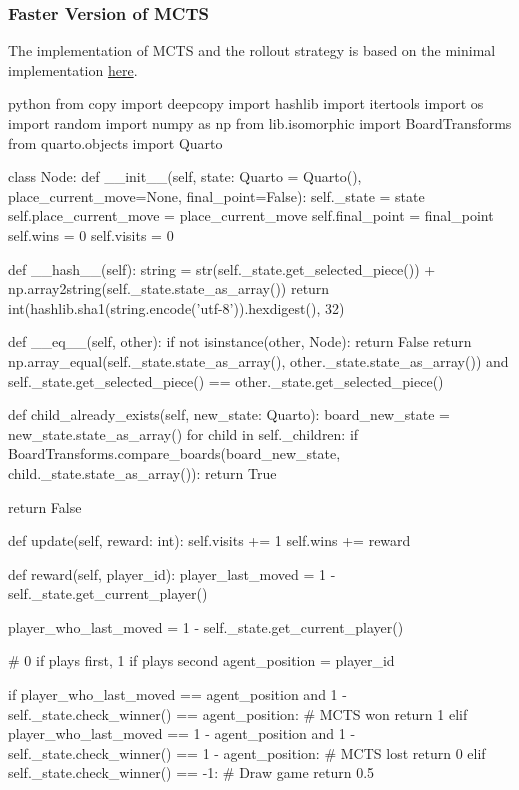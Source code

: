 \subsubsection{Faster Version of MCTS}

The implementation of MCTS and the rollout strategy is based on the minimal implementation \href{https://gist.github.com/qpwo/c538c6f73727e254fdc7fab81024f6e1}{here}.

\begin{mintedbox}{python}
from copy import deepcopy
import hashlib
import itertools
import os
import random
import numpy as np
from lib.isomorphic import BoardTransforms
from quarto.objects import Quarto

class Node:
    def __init__(self, state: Quarto = Quarto(), place_current_move=None, final_point=False):
        self._state = state
        self.place_current_move = place_current_move
        self.final_point = final_point
        self.wins = 0
        self.visits = 0

    def __hash__(self):
        string = str(self._state.get_selected_piece()) + np.array2string(self._state.state_as_array())
        return int(hashlib.sha1(string.encode('utf-8')).hexdigest(), 32)

    def __eq__(self, other):
        if not isinstance(other, Node):
            return False
        return np.array_equal(self._state.state_as_array(), other._state.state_as_array()) and self._state.get_selected_piece() == other._state.get_selected_piece()

    def child_already_exists(self, new_state: Quarto):
        board_new_state = new_state.state_as_array()
        for child in self._children:
            if BoardTransforms.compare_boards(board_new_state, child._state.state_as_array()):
                return True

        return False

    def update(self, reward: int):
        self.visits += 1
        self.wins += reward

    def reward(self, player_id):
        player_last_moved = 1 - self._state.get_current_player()

        player_who_last_moved = 1 - self._state.get_current_player()

        # 0 if plays first, 1 if plays second
        agent_position = player_id

        if player_who_last_moved == agent_position and 1 - self._state.check_winner() == agent_position:
            # MCTS won
            return 1
        elif player_who_last_moved == 1 - agent_position and 1 - self._state.check_winner() == 1 - agent_position:
            # MCTS lost
            return 0
        elif self._state.check_winner() == -1:
            # Draw game
            return 0.5


\end{mintedbox}

